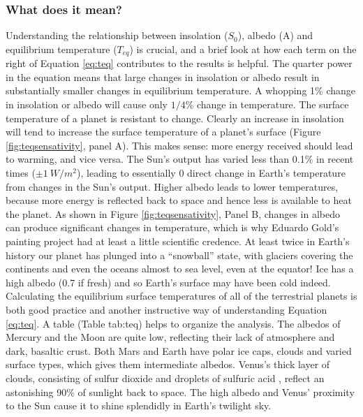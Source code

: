\documentclass[amstex,12pt]{book}
\begin{document}
\subsubsection{What does it mean?}
Understanding the relationship between insolation ($S_0$), albedo (A) and equilibrium temperature ($T_{eq}$) is crucial, and a brief look at how each term on the right of Equation \ref{eq:teq} contributes to the results is helpful. The quarter power in the equation means that large changes in insolation or albedo result in substantially smaller changes in equilibrium temperature. A whopping 1\% change in insolation or albedo will cause only $1/4$\% change in temperature. The surface temperature of a planet is resistant to change. Clearly an increase in insolation will tend to increase the surface temperature of a planet's surface (Figure \ref{fig:teqsensativity}, panel A). This makes sense: more energy received should lead to warming, and vice versa. The Sun's output has varied less than 0.1\% in recent times ($\pm \SI{1}{W/m^2}$), leading to essentially 0 direct change in Earth's temperature from changes in the Sun's output. Higher albedo leads to lower temperatures, because more energy is reflected back to space and hence less is available to heat the planet. As shown in Figure \ref{fig:teqsensativity}, Panel B, changes in albedo can produce significant changes in temperature, which is why Eduardo Gold's painting project had at least a little scientific credence. At least twice in Earth's history our planet has plunged into a ``snowball'' state, with glaciers covering the continents and even the oceans almost to sea level, even at the equator! Ice has a high albedo (0.7 if fresh) and so Earth’s surface may have been cold indeed.\\
Calculating the equilibrium surface temperatures of all of the terrestrial planets is both good practice and another instructive way of understanding Equation \ref{eq:teq}. A table (Table {tab:teq}) helps to organize the analysis. The albedos of Mercury and the Moon are quite low, reflecting their lack of atmosphere and dark, basaltic crust. Both Mars and Earth have polar ice caps, clouds and varied surface types, which gives them intermediate albedos. Venus's thick layer of clouds, consisting of sulfur dioxide and droplets of sulfuric acid , reflect an astonishing 90\% of sunlight back to space. The high albedo and Venus' proximity to the Sun cause it to shine splendidly in Earth's twilight sky.
\end{document}
